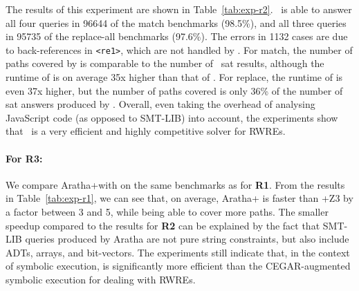 The results of this experiment are shown in
Table~\ref{tab:exp-r2}. \ostrich\ is able to answer all four queries
in 96644 of the match benchmarks (98.5\%), and all three queries in
95735 of the replace-all benchmarks (97.6\%). The errors in 1132 cases
are due to back-references in \verb!<re1>!, which are not handled by
\ostrich.  For match, the number of paths covered by \expose{} is
comparable to the number of \ostrich\ sat results, although the
runtime of \expose{} is on average 35x higher than that of
\ostrich. For replace, the runtime of \expose{} is even 37x higher,
but the number of paths covered is only 36\% of the number of sat
answers produced by \ostrich. Overall, even taking the overhead of
analysing JavaScript code (as opposed to SMT-LIB) into account, the
experiments show that \ostrich\ is a very efficient and highly
competitive solver for RWREs.

\paragraph{For \textbf{R3}:} We compare Aratha+\ostrich with \expose{}
on the same benchmarks as for \textbf{R1}.  From the results in
Table~\ref{tab:exp-r1}, we can see that, on average, Aratha+{\ostrich}
is faster than \expose{}+Z3 by a factor between 3 and 5, while being
able to cover more paths. The smaller speedup compared to the results
for \textbf{R2} can be explained by the fact that SMT-LIB queries
produced by Aratha are not pure string constraints, but also include
ADTs, arrays, and bit-vectors. The experiments still indicate that,
in the context of symbolic execution, {\ostrich} is significantly more
efficient than the CEGAR-augmented symbolic execution for dealing
with RWREs.
